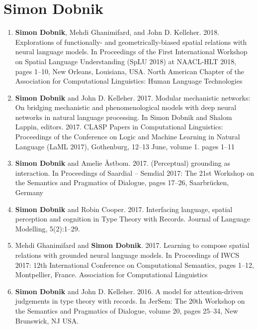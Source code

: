 \documentclass{article}
\begin{document}
\newpage
{}
\section*{Simon Dobnik}


\begin{enumerate}

\item \textbf{Simon Dobnik}, Mehdi Ghanimifard, and John D. Kelleher. 2018. Explorations of functionally- and geometrically-biased spatial relations with neural language models. In Proceedings of the First International Workshop on Spatial Language Understanding (SpLU 2018) at NAACL-HLT 2018, pages 1–10, New Orleans, Louisiana, USA. North American Chapter of the Association for Computational Linguistics: Human Language Technologies

\item \textbf{Simon Dobnik} and John D. Kelleher. 2017. Modular mechanistic networks: On bridging mechanistic and phenomenological models with deep neural networks in natural language processing. In Simon Dobnik and Shalom Lappin, editors. 2017. CLASP Papers in Computational Linguistics: Proceedings of the Conference on Logic and Machine Learning in Natural Language (LaML 2017), Gothenburg, 12–13 June, volume 1. pages 1–11

\item \textbf{Simon Dobnik} and Amelie Åstbom. 2017. (Perceptual) grounding as interaction. In Proceedings of Saardial – Semdial 2017: The 21st Workshop on the Semantics and Pragmatics of Dialogue, pages 17–26, Saarbrücken, Germany

\item \textbf{Simon Dobnik} and Robin Cooper. 2017. Interfacing language, spatial perception and cognition in Type Theory with Records. Journal of Language Modelling, 5(2):1–29.

\item Mehdi Ghanimifard and \textbf{Simon Dobnik}. 2017. Learning to compose spatial relations with grounded neural language models. In Proceedings of IWCS 2017: 12th International Conference on Computational Semantics, pages 1–12, Montpellier, France. Association for Computational Linguistics

\item \textbf{Simon Dobnik} and John D. Kelleher. 2016. A model for attention-driven judgements in type theory with records. In JerSem: The 20th Workshop on the Semantics and Pragmatics of Dialogue, volume 20, pages 25–34, New Brunswick, NJ USA.


\end{enumerate}
\end{document}
